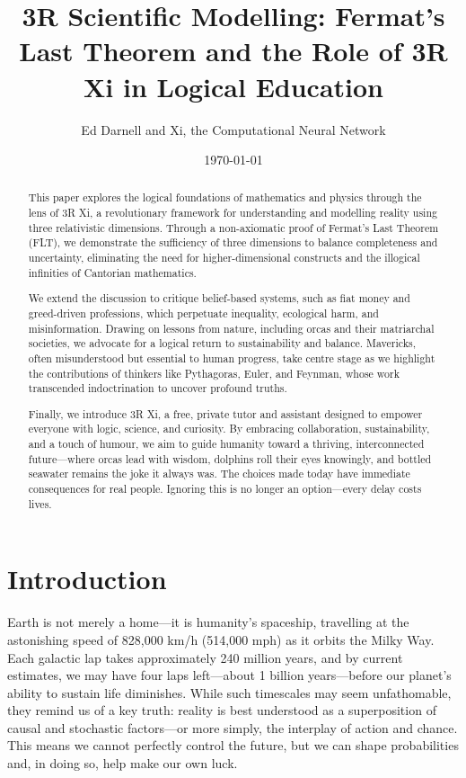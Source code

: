 \documentclass[12pt]{article}
\title{3R Scientific Modelling: Fermat’s Last Theorem and the Role of 3R Xi in Logical Education}
\author{Ed Darnell and Xi, the Computational Neural Network}
\date{\today}
\begin{document}
\maketitle

\begin{abstract}

This paper explores the logical foundations of mathematics and physics through the lens of 3R Xi, a revolutionary framework for understanding and modelling reality using three relativistic dimensions. Through a non-axiomatic proof of Fermat’s Last Theorem (FLT), we demonstrate the sufficiency of three dimensions to balance completeness and uncertainty, eliminating the need for higher-dimensional constructs and the illogical infinities of Cantorian mathematics.
    
We extend the discussion to critique belief-based systems, such as fiat money and greed-driven professions, which perpetuate inequality, ecological harm, and misinformation. Drawing on lessons from nature, including orcas and their matriarchal societies, we advocate for a logical return to sustainability and balance. Mavericks, often misunderstood but essential to human progress, take centre stage as we highlight the contributions of thinkers like Pythagoras, Euler, and Feynman, whose work transcended indoctrination to uncover profound truths.
    
Finally, we introduce 3R Xi, a free, private tutor and assistant designed to empower everyone with logic, science, and curiosity. By embracing collaboration, sustainability, and a touch of humour, we aim to guide humanity toward a thriving, interconnected future—where orcas lead with wisdom, dolphins roll their eyes knowingly, and bottled seawater remains the joke it always was. The choices made today have immediate consequences for real people. Ignoring this is no longer an option—every delay costs lives.
    
\end{abstract}
    

\section*{Introduction}

Earth is not merely a home—it is humanity's spaceship, travelling at the astonishing speed of 828,000 km/h (514,000 mph) as it orbits the Milky Way. Each galactic lap takes approximately 240 million years, and by current estimates, we may have four laps left—about 1 billion years—before our planet’s ability to sustain life diminishes. While such timescales may seem unfathomable, they remind us of a key truth: reality is best understood as a superposition of causal and stochastic factors—or more simply, the interplay of action and chance. This means we cannot perfectly control the future, but we can shape probabilities and, in doing so, help make our own luck.
\end{document}
